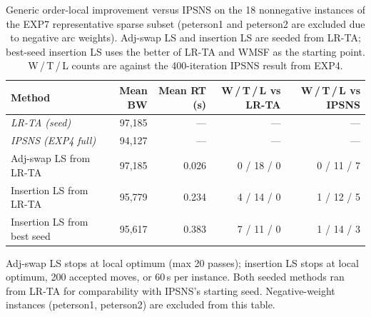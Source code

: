 \begin{table}[htbp]
\centering
\footnotesize
\caption{Generic order-local improvement versus IPSNS on the 18 nonnegative
instances of the EXP7 representative sparse subset (peterson1 and peterson2 are
excluded due to negative arc weights).
Adj-swap LS and insertion LS are seeded from LR-TA; best-seed insertion LS
uses the better of LR-TA and WMSF as the starting point.
W\,/\,T\,/\,L counts are against the 400-iteration IPSNS result from EXP4.}
\label{tab:plain_local_search}
\begin{tabular}{@{}lrrrr@{}}
\toprule
Method & Mean BW & Mean RT (s) & W\,/\,T\,/\,L vs LR-TA & W\,/\,T\,/\,L vs IPSNS \\
\midrule
\textit{LR-TA (seed)} & 97,185 & --- & --- & --- \\
\textit{IPSNS (EXP4 full)} & 94,127 & --- & --- & --- \\
Adj-swap LS from LR-TA & 97,185 & 0.026 & 0 / 18 / 0 & 0 / 11 / 7 \\
Insertion LS from LR-TA & 95,779 & 0.234 & 4 / 14 / 0 & 1 / 12 / 5 \\
Insertion LS from best seed & 95,617 & 0.383 & 7 / 11 / 0 & 1 / 14 / 3 \\
\bottomrule
\end{tabular}
\vspace{3pt}
{\footnotesize
Adj-swap LS stops at local optimum (max 20 passes); insertion LS stops at local
optimum, 200 accepted moves, or 60\,s per instance.
Both seeded methods ran from LR-TA for comparability with IPSNS's starting seed.
Negative-weight instances (peterson1, peterson2) are excluded from this table.}
\end{table}
